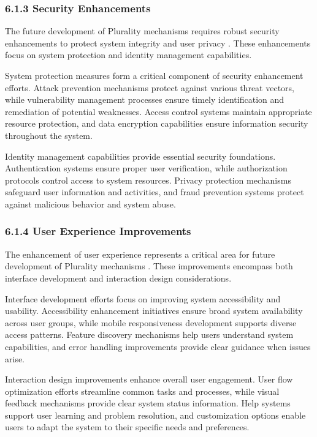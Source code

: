 \hypertarget{security-enhancements}{%
\subsubsection{6.1.3 Security Enhancements}\label{security-enhancements}}

The future development of Plurality mechanisms requires robust security enhancements to protect system integrity and user privacy \citep{communitynotes2024}. These enhancements focus on system protection and identity management capabilities.

System protection measures form a critical component of security enhancement efforts. Attack prevention mechanisms protect against various threat vectors, while vulnerability management processes ensure timely identification and remediation of potential weaknesses. Access control systems maintain appropriate resource protection, and data encryption capabilities ensure information security throughout the system.

Identity management capabilities provide essential security foundations. Authentication systems ensure proper user verification, while authorization protocols control access to system resources. Privacy protection mechanisms safeguard user information and activities, and fraud prevention systems protect against malicious behavior and system abuse.

\hypertarget{user-experience-improvements}{%
\subsubsection{6.1.4 User Experience Improvements}\label{user-experience-improvements}}

The enhancement of user experience represents a critical area for future development of Plurality mechanisms \citep{pdis2024}. These improvements encompass both interface development and interaction design considerations.

Interface development efforts focus on improving system accessibility and usability. Accessibility enhancement initiatives ensure broad system availability across user groups, while mobile responsiveness development supports diverse access patterns. Feature discovery mechanisms help users understand system capabilities, and error handling improvements provide clear guidance when issues arise.

Interaction design improvements enhance overall user engagement. User flow optimization efforts streamline common tasks and processes, while visual feedback mechanisms provide clear system status information. Help systems support user learning and problem resolution, and customization options enable users to adapt the system to their specific needs and preferences.

